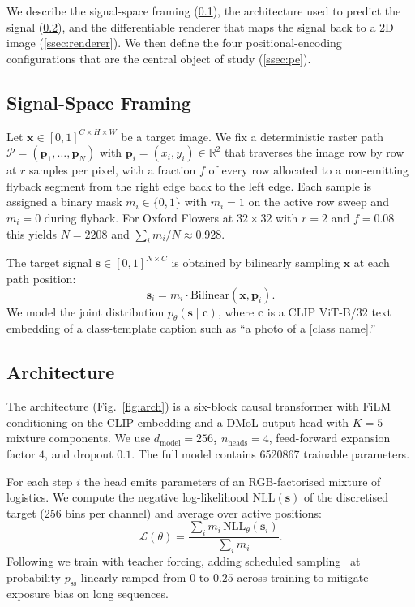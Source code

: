 \documentclass[conference]{IEEEtran}
\begin{document}
We describe the signal-space framing
(\cref{ssec:framing}), the architecture used to predict the signal
(\cref{ssec:arch}), and the differentiable renderer that maps the
signal back to a 2D image (\cref{ssec:renderer}). We then define
the four positional-encoding configurations that are the central
object of study (\cref{ssec:pe}).

\subsection{Signal-Space Framing}\label{ssec:framing}

Let $\mathbf{x}\in[0,1]^{C\times H\times W}$ be a target image. We
fix a deterministic raster path
$\mathcal{P}=(\mathbf{p}_1,\ldots,\mathbf{p}_N)$ with
$\mathbf{p}_i=(x_i,y_i)\in\mathbb{R}^2$ that traverses the image row
by row at $r$ samples per pixel, with a fraction $f$ of every row
allocated to a non-emitting flyback segment from the right edge
back to the left edge. Each sample is assigned a binary mask
$m_i\in\{0,1\}$ with $m_i=1$ on the active row sweep and $m_i=0$
during flyback. For Oxford Flowers at $32\times32$ with $r=2$ and
$f=0.08$ this yields $N=2208$ and $\sum_i m_i / N \approx 0.928$.

The target signal $\mathbf{s}\in[0,1]^{N\times C}$ is obtained by
bilinearly sampling $\mathbf{x}$ at each path position:
\begin{equation}
  \mathbf{s}_i = m_i \cdot \mathrm{Bilinear}(\mathbf{x},\mathbf{p}_i).
\end{equation}
We model the joint distribution
$p_\theta(\mathbf{s}\mid\mathbf{c})$, where $\mathbf{c}$ is a CLIP
ViT-B/32 text embedding of a class-template caption such as
``a photo of a [class name].''

\subsection{Architecture}\label{ssec:arch}

The architecture (Fig.~\ref{fig:arch}) is a six-block causal
transformer with FiLM~\cite{perez2018film} conditioning on the CLIP
embedding and a DMoL output head with $K=5$ mixture components.
We use \textbf{$d_{\text{model}}=256$, $n_{\text{heads}}=4$},
feed-forward expansion factor $4$, and dropout $0.1$. The full model
contains \num{6520867} trainable parameters.



For each step $i$ the head emits parameters of an RGB-factorised
mixture of logistics. We compute the negative log-likelihood
$\mathrm{NLL}(\mathbf{s})$ of the discretised target (256 bins per
channel) and average over active positions:
\begin{equation}
  \mathcal{L}(\theta) = \frac{\sum_i m_i \, \mathrm{NLL}_\theta(\mathbf{s}_i)}{\sum_i m_i}.
\end{equation}
Following \cite{salimans2017pixelcnnpp} we train with teacher forcing,
adding scheduled sampling~\cite{bengio2015scheduled} at probability
$p_{\text{ss}}$ linearly ramped from 0 to $0.25$ across training to
mitigate exposure bias on long sequences.
\end{document}

